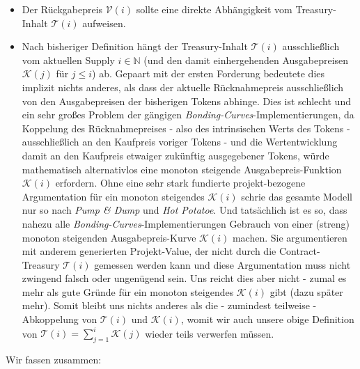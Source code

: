 \begin{itemize}
  \item Der Rückgabepreis $\mathcal{V} \left( i \right)$ sollte eine direkte Abhängigkeit vom Treasury-Inhalt $\mathcal{T} \left( i \right)$ aufweisen.
  \item Nach bisheriger Definition hängt der Treasury-Inhalt $\mathcal{T} \left( i \right)$ ausschließlich vom aktuellen Supply $i \in \mathbb{N}$ (und den damit einhergehenden Ausgabepreisen $\mathcal{K} \left( j \right)$ für $j \leq i$) ab. Gepaart mit der ersten Forderung bedeutete dies implizit nichts anderes, als dass der aktuelle Rücknahmepreis ausschließlich von den Ausgabepreisen der bisherigen Tokens abhinge. Dies ist schlecht und ein sehr großes Problem der gängigen \textit{Bonding-Curves}-Implementierungen, da Koppelung des Rücknahmepreises - also des intrinsischen Werts des Tokens - ausschließlich an den Kaufpreis voriger Tokens - und die Wertentwicklung damit an den Kaufpreis etwaiger zukünftig ausgegebener Tokens, würde mathematisch alternativlos eine monoton steigende Ausgabepreis-Funktion $\mathcal{K} \left( i \right)$ erfordern. Ohne eine sehr stark fundierte projekt-bezogene Argumentation für ein monoton steigendes $\mathcal{K} \left( i \right)$ schrie das gesamte Modell nur so nach \textit{Pump \& Dump} und \textit{Hot Potatoe}. Und tatsächlich ist es so, dass nahezu alle \textit{Bonding-Curves}-Implementierungen Gebrauch von einer (streng) monoton steigenden Ausgabepreis-Kurve $\mathcal{K} \left( i \right)$ machen. Sie argumentieren mit anderem generierten Projekt-Value, der nicht durch die Contract-Treasury $\mathcal{T} \left( i \right)$ gemessen werden kann und diese Argumentation muss nicht zwingend falsch oder ungenügend sein. Uns reicht dies aber nicht - zumal es mehr als gute Gründe für ein monoton steigendes $\mathcal{K} \left( i \right)$ gibt (dazu später mehr). Somit bleibt uns nichts anderes als die - zumindest teilweise - Abkoppelung von $\mathcal{T} \left( i \right)$ und $\mathcal{K} \left( i \right)$, womit wir auch unsere obige Definition von $\mathcal{T} \left( i \right) = \sum_{j = 1}^{i} \mathcal{K} \left( j \right)$ wieder teils verwerfen müssen.
\end{itemize} 

\vspace{0.2cm}

Wir fassen zusammen:

\vspace{0.3cm}

